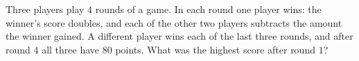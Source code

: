 Three players play $4$ rounds of a game. In each round one player wins: the winner's score doubles, and each of the other two players subtracts the amount the winner gained. A different player wins each of the last three rounds, and after round $4$ all three have $80$ points. What was the highest score after round $1$?
